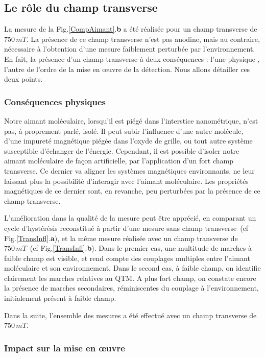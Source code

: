 \subsection{Le r\^ole du champ transverse}

La mesure de la Fig.\ref{CompAimant}.\textbf{b} a été réalisée pour un champ transverse de $750\,mT$. La présence de ce champ transverse n'est pas anodine, mais au contraire, nécessaire à l'obtention d'une mesure faiblement perturbée par l'environnement. En fait, la présence d'un champ transverse à deux conséquences : l'une physique , l'autre de l'ordre de la mise en œuvre de la détection. Nous allons détailler ces deux points.

\subsubsection{Conséquences physiques}
Notre aimant moléculaire, lorsqu'il est piégé dans l'interstice nanométrique, n'est pas, à proprement parlé, isolé. Il peut subir l'influence d'une autre molécule, d'une impureté magnétique piégée dans l'oxyde de grille, ou tout autre système susceptible d'échanger de l'énergie. Cependant, il est possible d'isoler notre aimant moléculaire de façon artificielle, par l'application d'un fort champ transverse. Ce dernier va aligner les systèmes magnétiques environnants, ne leur laissant plus la possibilité d'interagir avec l'aimant moléculaire. Les propriétés magnétiques de ce dernier sont, en revanche, peu perturbées par la présence de ce champ transverse.

L'amélioration dans la qualité de la mesure peut être apprécié, en comparant un cycle d'hystérésis reconstitué à partir d'une mesure sans champ transverse~(cf Fig.\ref{TransInfl}.\textbf{a}), et la même mesure réalisée avec un champ transverse de $750\,mT$~(cf Fig.\ref{TransInfl}.\textbf{b}). Dans le premier cas, une multitude de marches à faible champ est visible, et rend compte des couplages multiples entre l'aimant moléculaire et son environnement. Dans le second cas, à faible champ, on identifie clairement les marches relatives au QTM. A plus fort champ, on constate encore la présence de marches secondaires, réminiscentes du couplage à l'environnement, initialement présent à faible champ.

Dans la suite, l'ensemble des mesures a été effectué avec un champ transverse de $750\,mT$.

\subsubsection{Impact sur la mise en œuvre}

